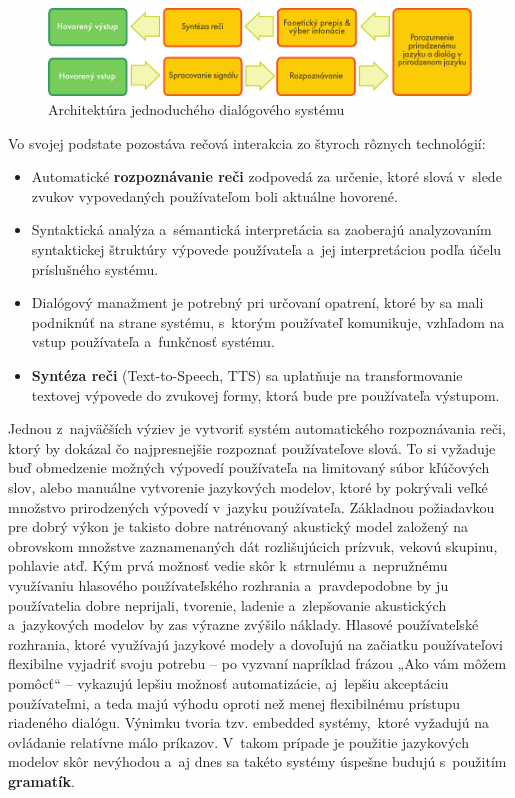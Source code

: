 \begin{multicols}{2}
\begin{figure}[htb]
  \center
  \includegraphics[width=\textwidth]{../_media/slovak/simple_speech-based_dialogue_architecture}
  \caption{Architektúra jednoduchého dialógového systému}
  \label{fig:dialoguearch_sk}
\end{figure}

Vo svojej podstate pozostáva rečová interakcia zo štyroch rôznych technológií:

\begin{itemize}
\item Automatické \textbf{rozpoznávanie reči} zodpovedá za určenie, ktoré slová v~slede zvukov vypovedaných používateľom boli aktuálne hovorené.
\item Syntaktická analýza a~sémantická interpretácia sa zaoberajú analyzovaním syntaktickej štruktúry výpovede používateľa a~jej interpretáciou podľa účelu príslušného systému.
\item Dialógový manažment je potrebný pri určovaní opatrení, ktoré by sa mali podniknúť na strane systému, s~ktorým používateľ komunikuje, vzhľadom na vstup používateľa a~funkčnosť systému.
\item \textbf{Syntéza reči} (Text-to-Speech, TTS) sa uplatňuje na transformovanie textovej výpovede do zvukovej formy, ktorá bude pre používateľa výstupom.
\end{itemize}

Jednou z~najväčších výziev je vytvoriť systém automatického
rozpoznávania reči, ktorý by dokázal čo najpresnejšie rozpoznať
používateľove slová. To si vyžaduje buď obmedzenie možných
výpovedí používateľa na limitovaný súbor kľúčových slov,
alebo manuálne vytvorenie jazykových modelov, ktoré by pokrývali
veľké množstvo prirodzených výpovedí v~jazyku používateľa.
Základnou požiadavkou pre dobrý výkon je takisto dobre natrénovaný
akustický model založený na obrovskom množstve zaznamenaných dát
rozlišujúcich prízvuk, vekovú skupinu, pohlavie atď. Kým prvá
možnosť vedie skôr k~strnulému a~nepružnému využívaniu
hlasového používateľského rozhrania a~pravdepodobne by ju
používatelia dobre neprijali, tvorenie, ladenie a~zlepšovanie
akustických a~jazykových modelov by zas výrazne zvýšilo náklady.
Hlasové používateľské rozhrania, ktoré využívajú jazykové
modely a dovoľujú na začiatku používateľovi flexibilne vyjadriť
svoju potrebu -- po vyzvaní napríklad frázou „Ako vám môžem
pomôcť“ -- vykazujú lepšiu možnosť automatizácie,
aj~lepšiu akceptáciu používateľmi, a teda majú výhodu oproti
než menej flexibilnému prístupu riadeného dialógu. Výnimku tvoria
tzv. embedded systémy,~ktoré vyžadujú na ovládanie relatívne málo
príkazov. V~takom prípade je použitie jazykových modelov
skôr nevýhodou a~aj dnes sa takéto systémy úspešne budujú
s~použitím \textbf{gramatík}.


\end{multicols}
